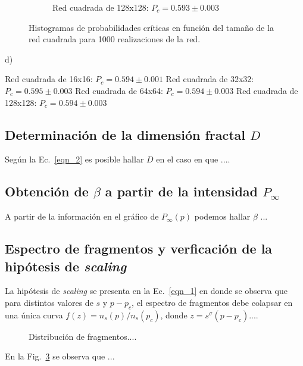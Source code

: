 \documentclass[%
 reprint,
 amsmath,amssymb,
 aps,
spanish]{revtex4-1}
\begin{document}
\begin{figure}[h]
\begin{subfigure}{.25\textwidth}
  \caption{Red cuadrada de 128x128: $P_c=0.593\pm0.003$}  
  \label{fig:1ahist}
\end{subfigure}
\caption{Histogramas de probabilidades críticas en función del tamaño de la red cuadrada para 1000 realizaciones de la red.}
\label{fig:histograma_red_cuadrada_1a}
\end{figure}

d)

Red cuadrada de 16x16: $P_c=0.594\pm0.001$
Red cuadrada de 32x32: $P_c=0.595\pm0.003$
Red cuadrada de 64x64: $P_c=0.594\pm0.003$
Red cuadrada de 128x128: $P_c=0.594\pm0.003$


\subsection{\label{D} Determinaci\'on de la dimensi\'on fractal $D$ }

Seg\'un la Ec.~\ref{eqn_2} es posible hallar $D$ en el caso en que ....

\subsection{\label{P} Obtenci\'on de $\beta$ a partir de la intensidad $P_\infty$}

A partir de la informaci\'on en el gr\'afico de $P_\infty(p)$ podemos hallar $\beta$ ...

\subsection{\label{S} Espectro de fragmentos y verficaci\'on de la hip\'otesis de \emph{scaling} }

La hip\'otesis de \emph{scaling} se presenta en la Ec.~\ref{eqn_1} en donde se observa que para distintos valores de $s$ y $p-p_c$, el espectro de fragmentos debe colapsar en una \'unica curva $f(z)=n_s(p)/n_s(p_c)$, donde $z=s^\sigma(p-p_c)$.... 

\begin{figure}[b]
\begin{center}
\caption{Distribuci\'on de fragmentos.... }\label{fig_1}
\end{center}
\end{figure}

En la Fig.~\ref{fig_1} se observa que ... \\
\end{document}
